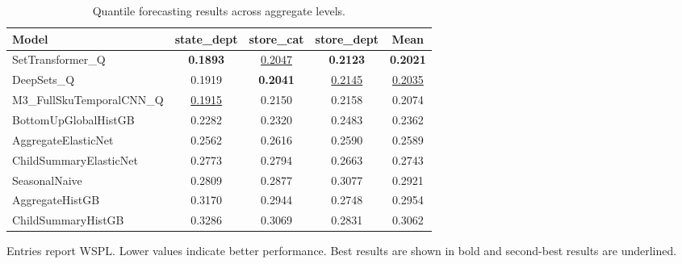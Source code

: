 \begin{table}[H]
\centering
\caption{Quantile forecasting results across aggregate levels.}
\label{tab:main_quantile}
\begin{threeparttable}
\begin{tabular}{lcccc}
\toprule
Model & state\_dept & store\_cat & store\_dept & Mean \\
\midrule
SetTransformer\_Q & \textbf{0.1893} & \underline{0.2047} & \textbf{0.2123} & \textbf{0.2021} \\
DeepSets\_Q & 0.1919 & \textbf{0.2041} & \underline{0.2145} & \underline{0.2035} \\
M3\_FullSkuTemporalCNN\_Q & \underline{0.1915} & 0.2150 & 0.2158 & 0.2074 \\
BottomUpGlobalHistGB & 0.2282 & 0.2320 & 0.2483 & 0.2362 \\
AggregateElasticNet & 0.2562 & 0.2616 & 0.2590 & 0.2589 \\
ChildSummaryElasticNet & 0.2773 & 0.2794 & 0.2663 & 0.2743 \\
SeasonalNaive & 0.2809 & 0.2877 & 0.3077 & 0.2921 \\
AggregateHistGB & 0.3170 & 0.2944 & 0.2748 & 0.2954 \\
ChildSummaryHistGB & 0.3286 & 0.3069 & 0.2831 & 0.3062 \\
\bottomrule
\end{tabular}
\begin{tablenotes}
\footnotesize \item Entries report WSPL. Lower values indicate better performance. Best results are shown in bold and second-best results are underlined.
\end{tablenotes}
\end{threeparttable}
\end{table}
